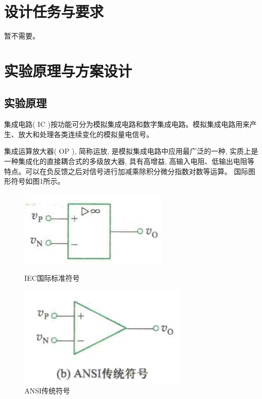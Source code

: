 \documentclass[10pt, a4paper]{article} %
\begin{document}
\section{设计任务与要求}

暂不需要。

\section{实验原理与方案设计}
\subsection{实验原理}
集成电路( IC )按功能可分为模拟集成电路和数字集成电路。模拟集成电路用来产生、放大和处理各类连续变化的模拟量电信号。

集成运算放大器( OP ), 简称运放, 是模拟集成电路中应用最广泛的一种, 实质上是一种集成化的直接耦合式的多级放大器, 具有高增益, 高输入电阻、低输出电阻等特点。可以在负反馈之后对信号进行加减乘除积分微分指数对数等运算。
国际图形符号如图1所示。

\begin{figure}[ht]
    \centering
    \begin{minipage}{0.45\linewidth}
        \centering
        \includegraphics[width=\linewidth]{image/1.png}
        \caption{IEC国际标准符号}
        \label{fig:op_amp_symbol}
    \end{minipage}
    \hfill
    \begin{minipage}{0.45\linewidth}
        \centering
        \includegraphics[width=\linewidth]{image/2.png}
        \caption{ANSI传统符号}
    \end{minipage}
\end{figure}
\end{document}
